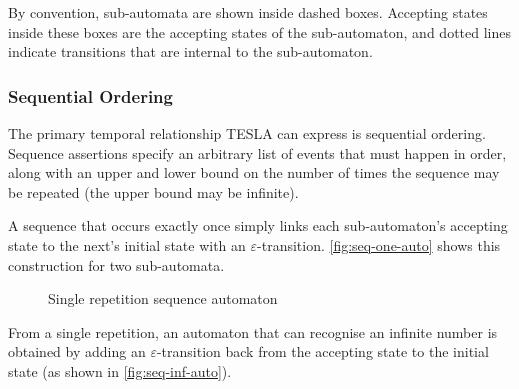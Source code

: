 By convention, sub-automata are shown inside dashed boxes. Accepting states
inside these boxes are the accepting states of the sub-automaton, and dotted
lines indicate transitions that are internal to the sub-automaton.

\subsubsection{Sequential Ordering}

The primary temporal relationship TESLA can express is sequential
ordering. Sequence assertions specify an arbitrary list of events that
must happen in order, along with an upper and lower bound on the number
of times the sequence may be repeated (the upper bound may be infinite).

A sequence that occurs exactly once simply links each sub-automaton's
accepting state to the next's initial state with an
$\varepsilon$-transition.  \autoref{fig:seq-one-auto} shows this
construction for two sub-automata.

\begin{figure}
  \centering
  \caption{Single repetition sequence automaton}
  \label{fig:seq-one-auto}
\end{figure}

From a single repetition, an automaton that can recognise an infinite
number is obtained by adding an $\varepsilon$-transition back from the
accepting state to the initial state (as shown in
\autoref{fig:seq-inf-auto}).


